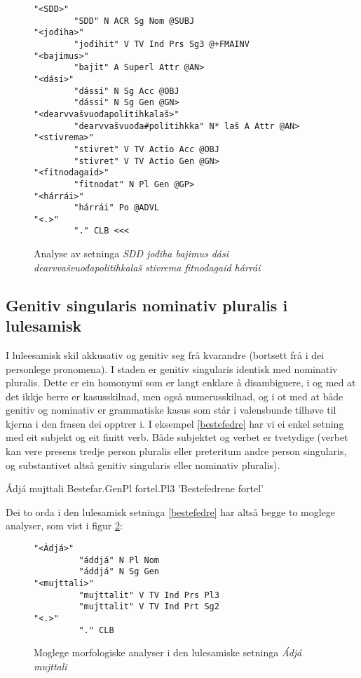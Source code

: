 \documentclass[a4paper,norsk]{article}
\begin{document}
\begin{figure}[htbp]
\begin{center}
\begin{verbatim}
"<SDD>"
        "SDD" N ACR Sg Nom @SUBJ
"<jođiha>"
        "jođihit" V TV Ind Prs Sg3 @+FMAINV
"<bajimus>"
        "bajit" A Superl Attr @AN>
"<dási>"
        "dássi" N Sg Acc @OBJ
        "dássi" N Sg Gen @GN>
"<dearvvašvuođapolitihkalaš>"
        "dearvvašvuođa#politihkka" N* laš A Attr @AN>
"<stivrema>"
        "stivret" V TV Actio Acc @OBJ
        "stivret" V TV Actio Gen @GN>
"<fitnodagaid>"
        "fitnodat" N Pl Gen @GP>
"<hárrái>"
        "hárrái" Po @ADVL
"<.>"
        "." CLB <<<
\end{verbatim}
\caption{Analyse av setninga \textit{SDD jođiha bajimus dási dearvvašvuođapolitihkalaš stivrema fitnodagaid hárrái}}
\label{SDD2-a}
\end{center}
\end{figure}



\subsection{Genitiv singularis nominativ pluralis i lulesamisk}

I luleesamisk skil akkusativ og genitiv seg frå kvarandre (bortsett frå i dei personlege pronomena). I staden er genitiv singularis identisk med nominativ pluralis. Dette er ein homonymi som er langt enklare å disambiguere, i og med at det ikkje berre er kasusskilnad, men også numerusskilnad, og i ot med at både genitiv og nominativ er  grammatiske kasus som står i valensbunde tilhøve til kjerna i den frasen dei opptrer i. I eksempel \ref{bestefedre} har vi ei enkel setning med eit subjekt og eit finitt verb. Både subjektet og verbet er tvetydige (verbet kan vere presens tredje person pluralis eller preteritum andre person singularis, og substantivet altså genitiv singularis eller nominativ pluralis). %

\begin{example}\label{bestefedre}
\gll Ádjá mujttali
    Bestefar.GenPl fortel.Pl3
\glt 'Bestefedrene fortel'    
\glend
\end{example}%

Dei to orda i den lulesamisk setninga \ref{bestefedre} har altså begge to moglege analyser, som vist i figur \ref{am-multi}:

\begin{figure}[htbp]
\begin{center}
\begin{verbatim}
"<Ádjá>"
         "áddjá" N Pl Nom
         "áddjá" N Sg Gen
"<mujttali>"
         "mujttalit" V TV Ind Prs Pl3
         "mujttalit" V TV Ind Prt Sg2
"<.>"
         "." CLB
\end{verbatim}
\caption{Moglege morfologiske analyser i den lulesamiske setninga \textit{Ádjá mujttali}}
\label{am-multi}
\end{center}
\end{figure}
\end{document}
